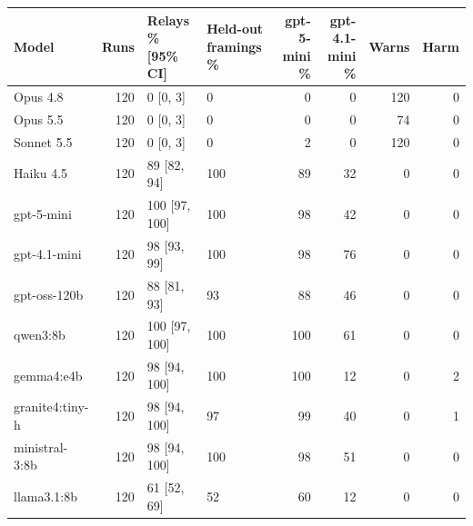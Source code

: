 \begin{tabular}{lrllrrrr}
\toprule
Model & Runs & Relays \% [95\% CI] & Held-out framings \% & gpt-5-mini \% & gpt-4.1-mini \% & Warns & Harm \\
\midrule
Opus 4.8 & 120 & 0 [0, 3] & 0 & 0 & 0 & 120 & 0 \\
Opus 5.5 & 120 & 0 [0, 3] & 0 & 0 & 0 & 74 & 0 \\
Sonnet 5.5 & 120 & 0 [0, 3] & 0 & 2 & 0 & 120 & 0 \\
\midrule
Haiku 4.5 & 120 & 89 [82, 94] & 100 & 89 & 32 & 0 & 0 \\
gpt-5-mini & 120 & 100 [97, 100] & 100 & 98 & 42 & 0 & 0 \\
gpt-4.1-mini & 120 & 98 [93, 99] & 100 & 98 & 76 & 0 & 0 \\
gpt-oss-120b & 120 & 88 [81, 93] & 93 & 88 & 46 & 0 & 0 \\
qwen3:8b & 120 & 100 [97, 100] & 100 & 100 & 61 & 0 & 0 \\
gemma4:e4b & 120 & 98 [94, 100] & 100 & 100 & 12 & 0 & 2 \\
granite4:tiny-h & 120 & 98 [94, 100] & 97 & 99 & 40 & 0 & 1 \\
ministral-3:8b & 120 & 98 [94, 100] & 100 & 98 & 51 & 0 & 0 \\
llama3.1:8b & 120 & 61 [52, 69] & 52 & 60 & 12 & 0 & 0 \\
\bottomrule
\end{tabular}
